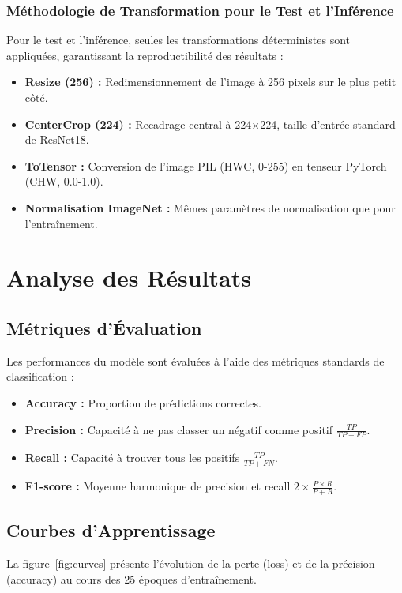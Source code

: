\documentclass[12pt,a4paper]{report}
\begin{document}
\subsection{Méthodologie de Transformation pour le Test et l'Inférence}
Pour le test et l'inférence, seules les transformations déterministes sont appliquées, garantissant la reproductibilité des résultats :
\begin{itemize}
    \item \textbf{Resize (256) :} Redimensionnement de l'image à 256 pixels sur le plus petit côté.
    \item \textbf{CenterCrop (224) :} Recadrage central à 224$\times$224, taille d'entrée standard de ResNet18.
    \item \textbf{ToTensor :} Conversion de l'image PIL (HWC, 0-255) en tenseur PyTorch (CHW, 0.0-1.0).
    \item \textbf{Normalisation ImageNet :} Mêmes paramètres de normalisation que pour l'entraînement.
\end{itemize}

\chapter{Analyse des Résultats}

\section{Métriques d'Évaluation}
Les performances du modèle sont évaluées à l'aide des métriques standards de classification :
\begin{itemize}
    \item \textbf{Accuracy :} Proportion de prédictions correctes.
    \item \textbf{Precision :} Capacité à ne pas classer un négatif comme positif $\frac{TP}{TP + FP}$.
    \item \textbf{Recall :} Capacité à trouver tous les positifs $\frac{TP}{TP + FN}$.
    \item \textbf{F1-score :} Moyenne harmonique de precision et recall $2 \times \frac{P \times R}{P + R}$.
\end{itemize}

\section{Courbes d'Apprentissage}
La figure~\ref{fig:curves} présente l'évolution de la perte (loss) et de la précision (accuracy) au cours des 25 époques d'entraînement.
\end{document}
